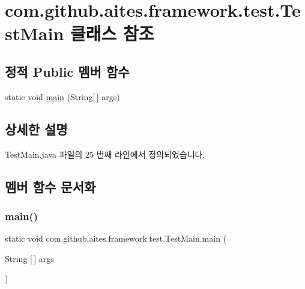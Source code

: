 \hypertarget{classcom_1_1github_1_1aites_1_1framework_1_1test_1_1_test_main}{}\section{com.\+github.\+aites.\+framework.\+test.\+Test\+Main 클래스 참조}
\label{classcom_1_1github_1_1aites_1_1framework_1_1test_1_1_test_main}
\subsection*{정적 Public 멤버 함수}
\begin{DoxyCompactItemize}
\item 
static void \mbox{\hyperlink{classcom_1_1github_1_1aites_1_1framework_1_1test_1_1_test_main_a5e5a23253b0feafa5feb998a86d258a8}{main}} (String\mbox{[}$\,$\mbox{]} args)
\end{DoxyCompactItemize}


\subsection{상세한 설명}


Test\+Main.\+java 파일의 25 번째 라인에서 정의되었습니다.



\subsection{멤버 함수 문서화}
\mbox{\label{classcom_1_1github_1_1aites_1_1framework_1_1test_1_1_test_main_a5e5a23253b0feafa5feb998a86d258a8}} 
\subsubsection{\texorpdfstring{main()}{main()}}
{\footnotesize\ttfamily static void com.\+github.\+aites.\+framework.\+test.\+Test\+Main.\+main (\begin{DoxyParamCaption}\item[{String \mbox{[}$\,$\mbox{]}}]{args }\end{DoxyParamCaption})\hspace{0.3cm}{\ttfamily [static]}}



